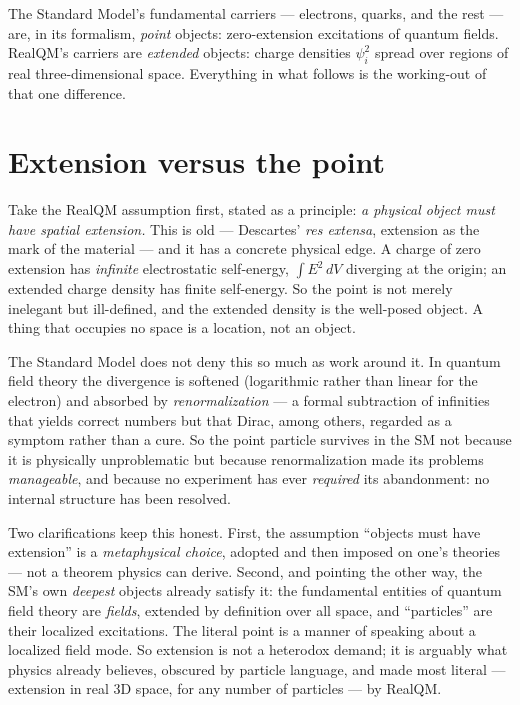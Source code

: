 \documentclass[11pt]{article}
\begin{document}
The Standard Model's fundamental carriers --- electrons, quarks, and the rest --- are, in its formalism,
\emph{point} objects: zero-extension excitations of quantum fields. RealQM's carriers are \emph{extended}
objects: charge densities $\psi_i^2$ spread over regions of real three-dimensional space. Everything in what
follows is the working-out of that one difference.

\section{Extension versus the point}
\label{sec:ext}

Take the RealQM assumption first, stated as a principle: \emph{a physical object must have spatial
extension.} This is old --- Descartes' \emph{res extensa}, extension as the mark of the material --- and it
has a concrete physical edge. A charge of zero extension has \emph{infinite} electrostatic self-energy,
$\int E^2\,dV$ diverging at the origin; an extended charge density has finite self-energy. So the point is
not merely inelegant but ill-defined, and the extended density is the well-posed object. A thing that
occupies no space is a location, not an object.

The Standard Model does not deny this so much as work around it. In quantum field theory the divergence is
softened (logarithmic rather than linear for the electron) and absorbed by \emph{renormalization} --- a
formal subtraction of infinities that yields correct numbers but that Dirac, among others, regarded as a
symptom rather than a cure. So the point particle survives in the SM not because it is physically
unproblematic but because renormalization made its problems \emph{manageable}, and because no experiment
has ever \emph{required} its abandonment: no internal structure has been resolved.

Two clarifications keep this honest. First, the assumption ``objects must have extension'' is a
\emph{metaphysical choice}, adopted and then imposed on one's theories --- not a theorem physics can
derive. Second, and pointing the other way, the SM's own \emph{deepest} objects already satisfy it: the
fundamental entities of quantum field theory are \emph{fields}, extended by definition over all space, and
``particles'' are their localized excitations. The literal point is a manner of speaking about a localized
field mode. So extension is not a heterodox demand; it is arguably what physics already believes,
obscured by particle language, and made most literal --- extension in real 3D space, for any number of
particles --- by RealQM.
\end{document}
